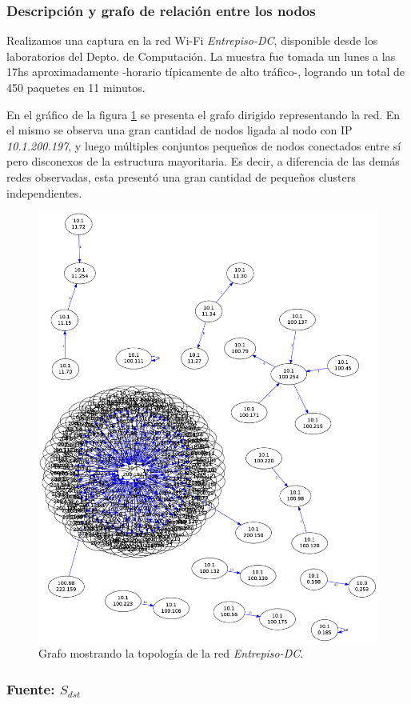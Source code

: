 \subsubsection{Descripción y grafo de relación entre los nodos}

Realizamos una captura en la red Wi-Fi \emph{Entrepiso-DC}, disponible desde los laboratorios del Depto. de Computación. La muestra fue tomada un lunes a las 17hs aproximadamente -horario típicamente de alto tráfico-, logrando un total de 450 paquetes en 11 minutos.

En el gráfico de la figura \ref{fig:entrepiso-dc-grafo} se presenta el grafo dirigido representando la red. En el mismo se observa una gran cantidad de nodos ligada al nodo con IP \emph{10.1.200.197}, y luego múltiples conjuntos pequeños de nodos conectados entre sí pero disconexos de la estructura mayoritaria. Es decir, a diferencia de las demás redes observadas, esta presentó una gran cantidad de pequeños clusters independientes.

\begin{figure}[H]
  \begin{center}
    \includegraphics[width=0.6\linewidth]{../imgs/red-entrepiso-dc_red.png}
    \caption{Grafo mostrando la topología de la red \emph{Entrepiso-DC}.}
    \label{fig:entrepiso-dc-grafo}
  \end{center}
\end{figure}

\subsubsection{Fuente: $S_{dst}$}

